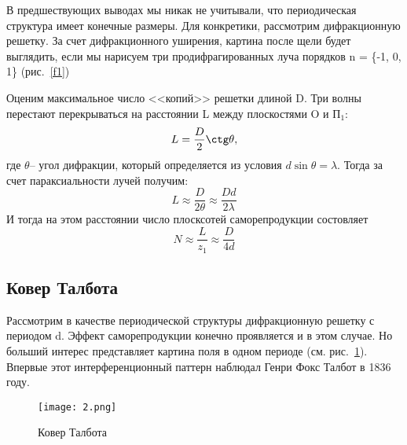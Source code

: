 \documentclass{urticle}
\begin{document}
    В предшествующих выводах мы никак не учитывали, что периодическая структура имеет конечные размеры. Для конкретики, рассмотрим дифракционную решетку. За счет дифракционного уширения, картина после щели будет выглядить, если мы нарисуем три продифрагированных луча порядков n = \{-1, 0, 1\} (рис.~\ref{f1})

    Оценим максимальное число <<копий>> решетки длиной D. Три волны перестают перекрываться на расстоянии L между плоскостями O и П$_1$:
    \begin{equation}
        L = \frac{D}{2}\ctg\theta,
    \end{equation}
    где $\theta$-- угол дифракции, который определяется из условия $d\sin\theta = \lambda$. Тогда за счет параксиальности лучей получим:
    \begin{equation}
        L \approx \frac{D}{2\theta} \approx \frac{Dd}{2\lambda}
    \end{equation}
    И тогда на этом расстоянии число плосксотей саморепродукции состовляет
    \begin{equation}
        N \approx \frac{L}{z_1} \approx \frac{D}{4d}
    \end{equation}
\newpage
\subsection{Ковер Талбота}
    Рассмотрим в качестве периодической структуры дифракционную решетку с периодом d. 
    Эффект саморепродукции конечно проявляется и в этом случае. Но больший интерес представляет картина поля в одном периоде (см. рис.~\ref{f2}). Впервые этот интерференционный паттерн наблюдал Генри Фокс Талбот в 1836 году. 
    \begin{figure}[h]
        \begin{center}
            \texttt{[image: 2.png]}
        \end{center}
        \caption{Ковер Талбота}
        \label{f2}
    \end{figure}
    
\end{document}
